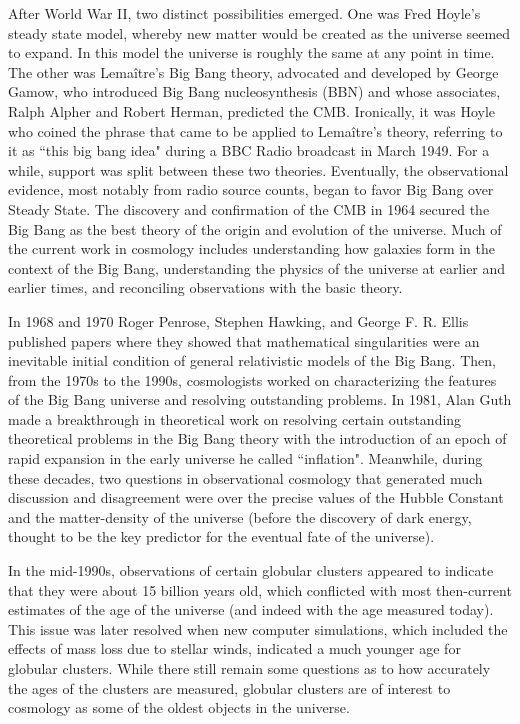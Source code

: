 \documentclass[14pt, oneside]{book}
\begin{document}
		After World War II, two distinct possibilities emerged. One was Fred Hoyle's steady state model, whereby new matter would be created as the universe seemed to expand. In this model the universe is roughly the same at any point in time. The other was Lemaître's Big Bang theory, advocated and developed by George Gamow, who introduced Big Bang nucleosynthesis (BBN) and whose associates, Ralph Alpher and Robert Herman, predicted the CMB. Ironically, it was Hoyle who coined the phrase that came to be applied to Lemaître's theory, referring to it as ``this big bang idea" during a BBC Radio broadcast in March 1949. For a while, support was split between these two theories. Eventually, the observational evidence, most notably from radio source counts, began to favor Big Bang over Steady State. The discovery and confirmation of the CMB in 1964 secured the Big Bang as the best theory of the origin and evolution of the universe. Much of the current work in cosmology includes understanding how galaxies form in the context of the Big Bang, understanding the physics of the universe at earlier and earlier times, and reconciling observations with the basic theory.
		
		In 1968 and 1970 Roger Penrose, Stephen Hawking, and George F. R. Ellis published papers where they showed that mathematical singularities were an inevitable initial condition of general relativistic models of the Big Bang. Then, from the 1970s to the 1990s, cosmologists worked on characterizing the features of the Big Bang universe and resolving outstanding problems. In 1981, Alan Guth made a breakthrough in theoretical work on resolving certain outstanding theoretical problems in the Big Bang theory with the introduction of an epoch of rapid expansion in the early universe he called ``inflation". Meanwhile, during these decades, two questions in observational cosmology that generated much discussion and disagreement were over the precise values of the Hubble Constant and the matter-density of the universe (before the discovery of dark energy, thought to be the key predictor for the eventual fate of the universe).
		
		In the mid-1990s, observations of certain globular clusters appeared to indicate that they were about 15 billion years old, which conflicted with most then-current estimates of the age of the universe (and indeed with the age measured today). This issue was later resolved when new computer simulations, which included the effects of mass loss due to stellar winds, indicated a much younger age for globular clusters. While there still remain some questions as to how accurately the ages of the clusters are measured, globular clusters are of interest to cosmology as some of the oldest objects in the universe.
		
\end{document}
